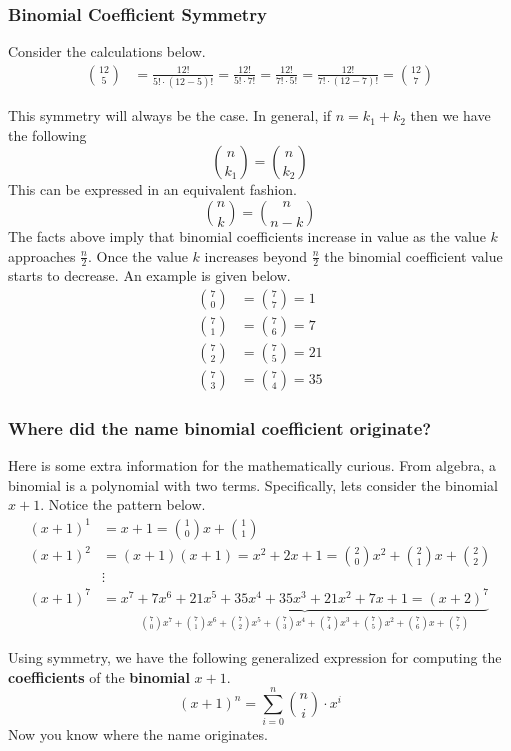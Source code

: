 \subsubsection*{Binomial Coefficient Symmetry}
Consider the calculations below.
\begin{align*}
    \binom{12}{5} &= \frac{12!}{5! \cdot (12-5)!} = \frac{12!}{5! \cdot 7!} =  \frac{12!}{7! \cdot 5!} = \frac{12!}{7! \cdot (12-7)!} = \binom{12}{7}
\end{align*}

This symmetry will always be the case. In general, if $n = k_1 + k_2$ then we have the following
$$\binom{n}{k_1} = \binom{n}{k_2}$$
This can be expressed in an equivalent fashion.
$$\binom{n}{k} = \binom{n}{n-k}$$
The facts above imply that binomial coefficients increase in value as the value $k$ approaches $\frac{n}{2}$.  Once the value $k$ increases beyond $\frac{n}{2}$ the binomial coefficient value starts to decrease.  An example is given below.
\begin{align*}
    \binom{7}{0} &= \binom{7}{7} =1 \\
    \binom{7}{1} &=  \binom{7}{6} = 7 \\
    \binom{7}{2} &=  \binom{7}{5} = 21 \\
    \binom{7}{3} &=  \binom{7}{4} = 35 
\end{align*}
\subsubsection*{Where did the name binomial coefficient originate?}
Here is some extra information for the mathematically curious. From algebra, a binomial is a polynomial with two terms.  Specifically, lets consider the binomial $x+1$.  Notice the pattern below.
\begin{align*}
    (x+1)^1 &= x+1 = \binom{1}{0}x + \binom{1}{1} \\
    (x+1)^2 &= (x+1)(x+1) = x^2 + 2x + 1 = \binom{2}{0}x^2 + \binom{2}{1}x + \binom{2}{2} \\
    &\vdots\\
    (x+1)^7 &= \underbrace{x^7 + 7x^6 + 21x^5 + 35x^4 + 35x^3 + 21x^2 + 7x + 1 = (x+2)^7}_{\binom{7}{0} x^7 + \binom{7}{1} x^6 + \binom{7}{2} x^5 + \binom{7}{3} x^4 + \binom{7}{4} x^3 + \binom{7}{5} x^2 + \binom{7}{6} x + \binom{7}{7}}
\end{align*}

Using symmetry, we have the following generalized expression for computing the \textbf{coefficients} of the \textbf{binomial} $x+1$.
$$(x+1)^n = \sum\limits_{i=0}^n \binom{n}{i} \cdot x^i$$
Now you know where the name originates.